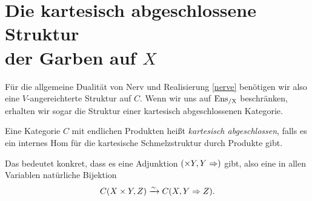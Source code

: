 \section[Die kartesisch abgeschlossene Struktur der Garben auf
  \texorpdfstring{$X$}{X}]
        {\texorpdfstring{Die kartesisch abgeschlossene Struktur\\
            der Garben auf $X$}
          {Die kartesisch abgeschlossene Struktur
            der Garben auf X}
            }
\label{sec:ensx-cart-closed}

Für die allgemeine Dualität von Nerv und Realisierung \ref{nerve}
benötigen wir also eine $V$-angereichterte Struktur auf $C$. Wenn wir
uns auf $\operatorname{Ens_{/X}}$ beschränken, erhalten wir sogar die Struktur einer
kartesisch abgeschlossenen Kategorie.
\begin{defn}
  Eine Kategorie $C$ mit endlichen Produkten heißt \emph{kartesisch
    abgeschlossen}, falls es ein internes Hom für die kartesische
  Schmelzstruktur durch Produkte gibt.
\end{defn}
Das bedeutet konkret, dass es eine Adjunktion $(\times Y, Y \Rightarrow)$
gibt, also eine in allen Variablen natürliche Bijektion
\[ C(X \times Y, Z) \xrightarrow[]{\sim} C(X, Y \Rightarrow Z). \]


